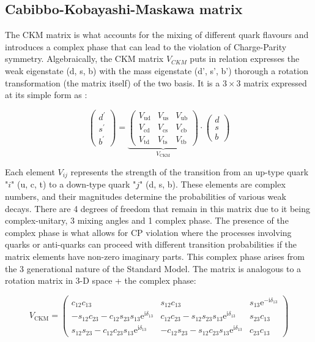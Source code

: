 \subsection{Cabibbo-Kobayashi-Maskawa matrix}

The CKM matrix is what accounts for the mixing of different quark flavours and introduces a complex phase that can lead to the violation of Charge-Parity symmetry. Algebraically, the CKM matrix $V_{CKM}$ puts in relation expresses the weak eigenstate (d, s, b) with the mass eigenstate (d', s', b') thorough a rotation transformation (the matrix itself) of the two basis. It is a $3\times3$ matrix expressed at its simple form as :

\[
\left(\begin{array}{c}
d^{\prime} \\
s^{\prime} \\
b^{\prime}
\end{array}\right)=\underbrace{\left(\begin{array}{lll}
V_{\mathrm{ud}} & V_{\mathrm{us}} & V_{\mathrm{ub}} \\
V_{\mathrm{cd}} & V_{\mathrm{cs}} & V_{\mathrm{cb}} \\
V_{\mathrm{td}} & V_{\mathrm{ts}} & V_{\mathrm{tb}}
\end{array}\right)}_{V_{\mathrm{CKM}}} \cdot\left(\begin{array}{c}
d \\
s \\
b
\end{array}\right)
\]

Each element $V_{ij}$ represents the strength of the transition from an up-type quark "$i$" (u, c, t) to a down-type quark "$j$" (d, s, b). These elements are complex numbers, and their magnitudes determine the probabilities of various weak decays. There are 4 degrees of freedom that remain in this matrix due to it being complex-unitary, 3 mixing angles and 1 complex phase. The presence of the complex phase is what allows for CP violation where the processes involving quarks or anti-quarks can proceed with different transition probabilities if the matrix elements have non-zero imaginary parts. This complex phase arises from the 3 generational nature of the Standard Model. The matrix is analogous to a rotation matrix in 3-D space + the complex phase:

\[
V_{\text{CKM}} = \left( 
\begin{array}{ccl}
    c_{12} c_{13} & s_{12} c_{13} & s_{13} \mathrm{e}^{-\mathrm{i} \delta_{13}} \\
    -s_{12} c_{23}-c_{12} s_{23} s_{13} \mathrm{e}^{\mathrm{i} \delta_{13}} & c_{12} c_{23}-s_{12} s_{23} s_{13} \mathrm{e}^{\mathrm{i} \delta_{13}} & s_{23} c_{13} \\
    s_{12} s_{23}-c_{12} c_{23} s_{13} \mathrm{e}^{\mathrm{i} \delta_{13}} & -c_{12} s_{23}-s_{12} c_{23} s_{13} \mathrm{e}^{\mathrm{i} \delta_{13}} & c_{23} c_{13}
\end{array}
\right)
\]

